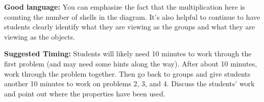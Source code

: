 \documentclass[nooutcomes, noauthor, handout]{ximera}
\begin{document}
\begin{instructorNotes}
\begin{itemize}
\end{itemize}

{\bf Good language:}  You can emphasize the fact that the multiplication here is counting the number of shells in the diagram. It's also helpful to continue to have students clearly identify what they are viewing as the groups and what they are viewing as the objects.


{\bf Suggested Timing:} Students will likely need 10 minutes to work through the first problem (and may need some hints along the way). After about 10 minutes, work through the problem together. Then go back to groups and give students another 10 minutes to work on problems 2, 3, and 4. Discuss the students' work and point out where the properties have been used.
\end{instructorNotes}
\end{document}
